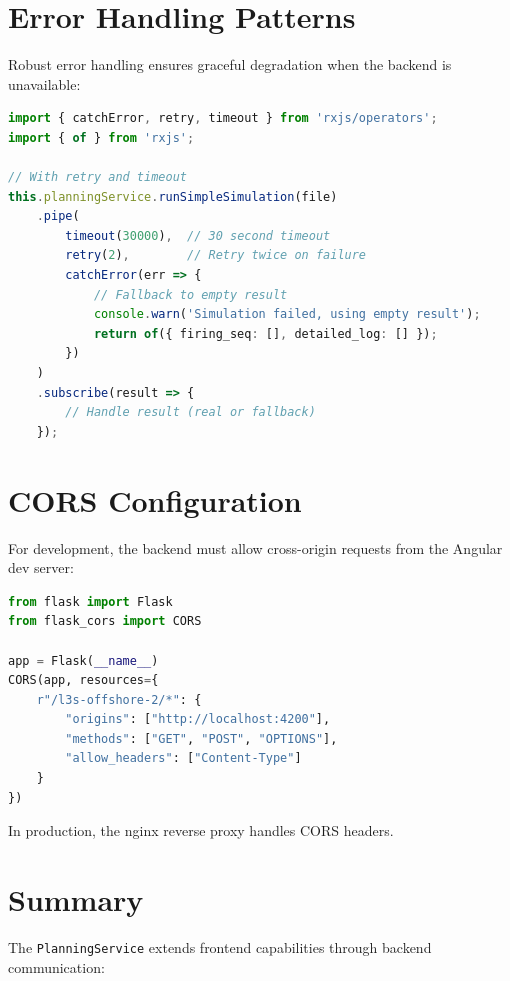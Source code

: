 \section{Error Handling Patterns}
\label{sec:planning-errors}

Robust error handling ensures graceful degradation when the backend is unavailable:

\begin{lstlisting}[language=TypeScript, caption={Error handling with retry and fallback}]
import { catchError, retry, timeout } from 'rxjs/operators';
import { of } from 'rxjs';

// With retry and timeout
this.planningService.runSimpleSimulation(file)
    .pipe(
        timeout(30000),  // 30 second timeout
        retry(2),        // Retry twice on failure
        catchError(err => {
            // Fallback to empty result
            console.warn('Simulation failed, using empty result');
            return of({ firing_seq: [], detailed_log: [] });
        })
    )
    .subscribe(result => {
        // Handle result (real or fallback)
    });
\end{lstlisting}

\section{CORS Configuration}
\label{sec:planning-cors}

For development, the backend must allow cross-origin requests from the Angular dev server:

\begin{lstlisting}[language=Python, caption={Flask CORS configuration (backend)}]
from flask import Flask
from flask_cors import CORS

app = Flask(__name__)
CORS(app, resources={
    r"/l3s-offshore-2/*": {
        "origins": ["http://localhost:4200"],
        "methods": ["GET", "POST", "OPTIONS"],
        "allow_headers": ["Content-Type"]
    }
})
\end{lstlisting}

In production, the nginx reverse proxy handles CORS headers.

\section{Summary}
\label{sec:planning-summary}

The \texttt{PlanningService} extends frontend capabilities through backend communication:

